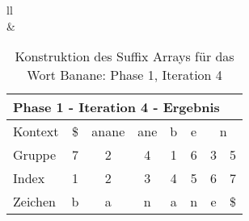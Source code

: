 \begin{table}[H]
\begin{adjustbox}{max width=\textwidth}
\begin{tabular}{ll}
\\
&
\\

\begin{tabular}{lccccccc}
\multicolumn{8}{l}{Phase 1 - Iteration 4 - Ergebnis}                                                                                                                                                              \\ \hline
\multicolumn{1}{l|}{Kontext} & \multicolumn{1}{c|}{\$} & \multicolumn{1}{c|}{\cellcolor[HTML]{\yellow}anane} & \multicolumn{1}{c|}{ane} & \multicolumn{1}{c|}{b} & \multicolumn{1}{c|}{e} & \multicolumn{2}{c}{n} \\
\multicolumn{1}{l|}{Gruppe}  & \multicolumn{1}{c|}{7}  & \multicolumn{1}{c|}{\cellcolor[HTML]{\yellow}2}     & \multicolumn{1}{c|}{4}   & \multicolumn{1}{c|}{1} & \multicolumn{1}{c|}{6} & 3         & 5          \\ \hline
\multicolumn{1}{l|}{Index}   & 1                       & 2                                                  & 3                        & 4                      & 5                      & 6         & 7          \\
\multicolumn{1}{l|}{Zeichen} & b                       & a                                                  & n                        & a                      & n                      & e         & \$        
\end{tabular}

\end{tabular}
\end{adjustbox}

\caption[Konstruktion des Suffix Arrays f{\"u}r das Wort Banane: Phase 1, Iteration 4]{Konstruktion des Suffix Arrays f{\"u}r das Wort Banane: Phase 1, Iteration 4}
\label{fig_banane_1_4} 
\end{table}
